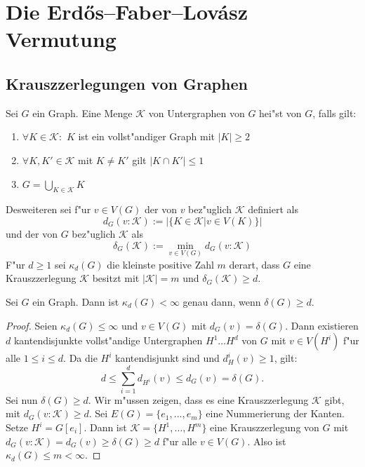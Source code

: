 \section{Die Erd\H{o}s--Faber--Lov\'asz Vermutung}
\label{sec:EFL-Vermutung}


\subsection{Krauszzerlegungen von Graphen}
\label{ssec:Krauszzerlegung}
\begin{definition}
    \label{def:Krauszzerlegung}
    Sei $G$ ein Graph. Eine Menge $\mathcal K$ von Untergraphen von $G$ hei"st  von $G$, falls gilt:
    \begin{enumerate}[label=(\roman*)]
        \item $\forall K \in \mathcal K:$ $K$ ist ein vollst"andiger Graph mit $|K| \geq 2$
        \item $\forall K, K'\in \mathcal K$ mit $K\neq K'$ gilt $|K\cap K'| \leq 1$
        \item $G=\bigcup\limits_{K\in \mathcal K}K$
    \end{enumerate}
    Desweiteren sei f"ur $v\in V(G)$ der  von $v$ bez"uglich $\mathcal K$ definiert als $$d_G(v:\mathcal K) := |\{ K\in\mathcal K| v \in V(K)\}|$$ und der  von $G$ bez"uglich $\mathcal K$ als $$\delta_G(\mathcal K) := \min\limits_{v\in V(G)}d_G(v:\mathcal K)$$ 
    F"ur $d \geq 1$ sei $\kappa_d(G)$ die kleinste positive Zahl $m$ derart, dass $G$ eine Krauszzerlegung $\mathcal K$ besitzt mit $|\mathcal K| = m$ und $\delta_G(\mathcal K) \geq d$.
\end{definition}

\begin{lemma}
  Sei $G$ ein Graph. Dann ist $\kappa_d(G) < \infty$ genau dann, wenn $\delta(G) \geq d$.
  \label{lm:krauszexistenz}
\end{lemma}

\begin{proof}
  Seien $\kappa_d(G) \leq\infty$ und $v\in V(G)$ mit $d_{G}(v) = \delta(G)$. Dann existieren $d$ kantendisjunkte vollst"andige Untergraphen $H^{1}\dots H^{d}$ von $G$ mit $v\in V(H^{i})$ f"ur alle $1\leq i \leq d$. Da die $H^{i}$ kantendisjunkt sind und $d_H^{i}(v)\geq1$, gilt: 
  \[
    d \leq \sum\limits_{i=1}^{d} d_{H^{i}}(v) \leq d_G(v) = \delta(G). 
  \]
  Sei nun $\delta(G) \geq d$. Wir m"ussen zeigen, dass es eine Krauszzerlegung $\mathcal{K}$ gibt, mit $d_{G}(v:\mathcal{K}) \geq d$. Sei $E(G)= \{e_1,\dots, e_{m}\}$ eine Nummerierung der Kanten. Setze $H^{i}= G[e_i]$. Dann ist $\mathcal{K} = \{H^{1},\dots, H^{m}\}$ eine Krauszzerlegung von $G$ mit $d_{G}(v:\mathcal{K}) = d_{G}(v) \geq \delta(G) \geq d$ f"ur alle $v\in V(G)$. Also ist $\kappa_d(G)\leq m <\infty$.

\end{proof}
